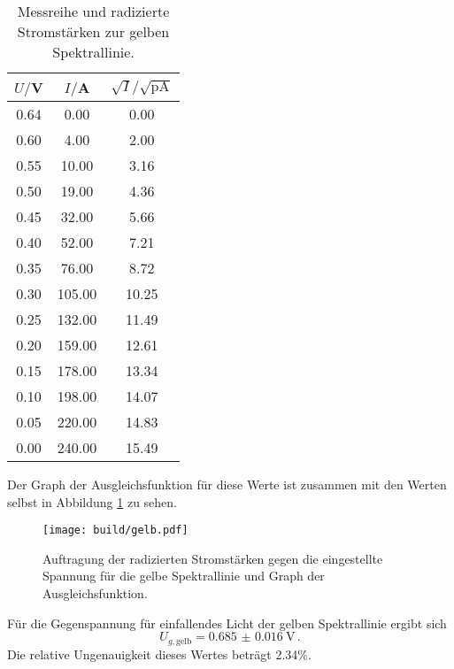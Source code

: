 \begin{table}[htp]
        \begin{center}
          \caption{Messreihe und radizierte Stromstärken zur gelben Spektrallinie.}
          \label{tab:gelb}
                \begin{tabular}{ccc}
                \toprule
                        {$U/$V} & {$I/$A} & {$\sqrt{I}/\mathrm{\sqrt{pA}}$}\\
                        \midrule
                        0.64 & 0.00 & 0.00\\
                        0.60 & 4.00 & 2.00\\
                        0.55 & 10.00 & 3.16\\
                        0.50 & 19.00 & 4.36\\
                        0.45 & 32.00 & 5.66\\
                        0.40 & 52.00 & 7.21\\
                        0.35 & 76.00 & 8.72\\
                        0.30 & 105.00 & 10.25\\
                        0.25 & 132.00 & 11.49\\
                        0.20 & 159.00 & 12.61\\
                        0.15 & 178.00 & 13.34\\
                        0.10 & 198.00 & 14.07\\
                        0.05 & 220.00 & 14.83\\
                        0.00 & 240.00 & 15.49\\
                \bottomrule
                \end{tabular}
        \end{center}
\end{table}

Der Graph der Ausgleichsfunktion für diese Werte ist zusammen mit den Werten selbst
in Abbildung \ref{fig:gelb} zu sehen.

\begin{figure}
  \centering
  \texttt{[image: build/gelb.pdf]}
  \caption{Auftragung der radizierten Stromstärken gegen die eingestellte Spannung für die gelbe Spektrallinie und Graph der Ausgleichsfunktion.}
  \label{fig:gelb}
\end{figure}

Für die Gegenspannung für einfallendes Licht der gelben Spektrallinie ergibt sich
\begin{equation}
  U_{g,\text{gelb}} = \SI{0.685(0016)}{\volt}\,.
\end{equation}
Die relative Ungenauigkeit dieses Wertes beträgt 2.34\%.


